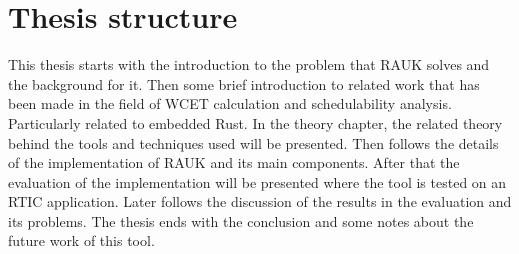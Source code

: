 \section{Thesis structure}
This thesis starts with the introduction to the problem that RAUK solves and
the background for it. Then some brief introduction to related work that has
been made in the field of WCET calculation and schedulability analysis.
Particularly related to embedded Rust. In the theory chapter, the related
theory behind the tools and techniques used will be presented. Then follows
the details of the implementation of RAUK and its main components. After that
the evaluation of the implementation will be presented where the tool is
tested on an RTIC application. Later follows the discussion of the results
in the evaluation and its problems. The thesis ends with the conclusion and
some notes about the future work of this tool.
